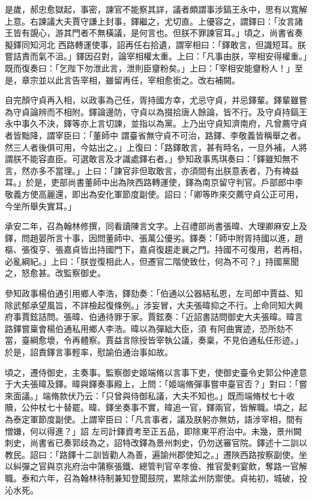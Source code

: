 \begin{pinyinscope}
 是歲，郝忠愈獄起，事密，諫官不能察其詳，議者頗謂事涉鎬王永中，思有以寬解上意。右諫議大夫賈守謙上封事，鐸繼之，尤切直。上優容之，謂鐸曰：「汝言諸王皆有覬心，游其門者不無橫議，是何言也。但朕不罪諫官耳。」頃之，尚書省奏擬鐸同知河北
 西路轉運使事，詔再任右拾遺，謂宰相曰：「鐸敢言，但識短耳。朕嘗詰責而氣不沮。」鐸因召對，論宰相權太重。上曰：「凡事由朕，宰相安得權重。」既而復奏曰：「乞陛下勿泄此言，泄則臣齏粉矣。」上曰：「宰相安能齏粉人！」至是，章宗並以此言告宰相，雖留再任，宰相愈銜之。改右補闕。



 自完顏守貞再入相，以政事為己任，胥持國方幸，尤忌守貞，并忌鐸輩。鐸輩雖嘗為守貞論辨而不相附。鐸論邊防，守貞以為掇拾唐人餘論，皆不行。及守貞持鎬王永中事久不決，鐸等亦上言切諫，並指以為黨。上乃出守貞知濟南府，凡曾薦守貞者皆黜降，謂宰臣曰：「董師中
 謂臺省無守貞不可治，路鐸、李敬義皆稱舉之者。然三人者後俱可用，今姑出之。」上復曰：「路鐸敢言，甚有時名，一旦外補，人將謂朕不能容直臣。可選敢言及才識處鐸右者。」參知政事馬琪奏曰：「鐸雖知無不言，然亦多不當理。」上曰：「諫官非但取敢言，亦須間有出朕意表者，乃有裨益耳。」於是，吏部尚書董師中出為陜西路轉運使，鐸為南京留守判官。戶部郎中李敬義方使高麗還，即出為安化軍節度副使。詔曰：「卿等昨來交薦守貞公正可用，今坐所舉失實耳。」



 承安二年，召為翰林修撰，同看讀陳言文字。上召禮部尚書張暐、大理卿麻安上及
 鐸，問趙晏所言十事，因問董師中、張萬公優劣。鐸奏：「師中附胥持國以進，趙樞、張復亨、張嘉貞皆出持國門下，嘉貞復趨走襄之門。持國不可復用，若再相，必亂綱紀。」上曰：「朕豈復相此人，但遷官二階使致仕，何為不可？」持國黨聞之，怒愈甚。改監察御史。



 參知政事楊伯通引用鄉人李浩，鐸劾奏：「伯通以公器結私恩，左司郎中賈益、知除武郁承望風旨，不詳檢起復條例。」涉妄冒，大夫張暐抑之不行。上命同知大興府事賈鉉詰問。張暐、伯通待罪于家。賈鉉奏：「近詔書詰問御史大夫張暐。暐言路鐸嘗稟會楊伯通私用鄉人李浩。暐以為彈絀大臣，須
 有阿曲實迹，恐所劾不當，臺綱愈壞，令再體察。賈益言除授皆宰執公議，奏稟，不見伯通私任形迹。」於是，詔責鐸言事輕率，慰諭伯通治事如故。



 頃之，遷侍御史，主奏事。監察御史姬端脩以言事下吏，使御史臺令史郭公仲達意于大夫張暐及鐸。暐與鐸奏事殿上，上問：「姬端脩彈事嘗申臺官否？」對曰：「嘗來面議。」端脩款伏乃云：「只曾與侍御私議，大夫不知也。」既而端脩杖七十收贖，公仲杖七十替罷。暐、鐸坐奏事不實，暐追一官，鐸兩官，皆解職。頃之，起為泰定軍節度副使。上謂宰臣曰：「凡言事者，議及朕躬亦無妨，語涉宰相，間有憎嫌，何以得進？」詔
 左司計鐸資考至正五品，即除東平府治中。未幾，景州闕刺史，尚書省已奏郭歧為之，詔特改鐸為景州刺史，仍勿送審官院。鐸述十二訓以教民。詔曰：「路鐸十二訓皆勸人為善，遍諭州郡使知之。」遷陜西路按察副使。坐以糾彈之官與京兆府治中蒲察張鐵、總管判官辛孝儉、推官愛剌宴飲，奪路一官解職。泰和六年，召為翰林待制兼知登聞鼓院，累除孟州防禦使。貞祐初，城破，投沁水死。




\end{pinyinscope}
